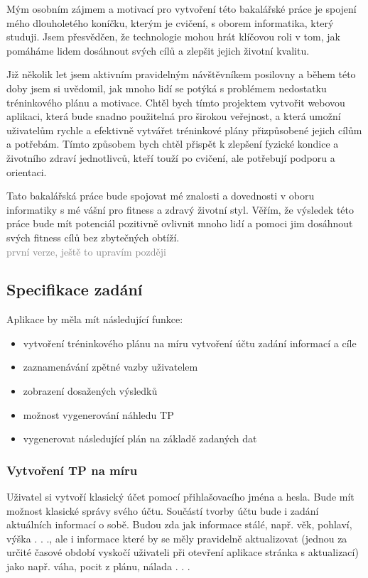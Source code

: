 \documentclass[
  field=inf,
  biblatex,
  glossaries,
  index
]{kidiplom}
\begin{document}
Mým osobním zájmem a motivací pro vytvoření této bakalářské práce je spojení mého dlouholetého koníčku, kterým je cvičení, s oborem informatika, který studuji. Jsem přesvědčen, že technologie mohou hrát klíčovou roli v tom, jak pomáháme lidem dosáhnout svých cílů a zlepšit jejich životní kvalitu.

Již několik let jsem aktivním pravidelným návštěvníkem posilovny a během této doby jsem si uvědomil, jak mnoho lidí se potýká s problémem nedostatku tréninkového plánu a motivace. Chtěl bych tímto projektem vytvořit webovou aplikaci, která bude snadno použitelná pro širokou veřejnost, a která umožní uživatelům rychle a efektivně vytvářet tréninkové plány přizpůsobené jejich cílům a potřebám. Tímto způsobem bych chtěl přispět k zlepšení fyzické kondice a životního zdraví jednotlivců, kteří touží po cvičení, ale potřebují podporu a orientaci.

Tato bakalářská práce bude spojovat mé znalosti a dovednosti v oboru informatiky s mé vášní pro fitness a zdravý životní styl. Věřím, že výsledek této práce bude mít potenciál pozitivně ovlivnit mnoho lidí a pomoci jim dosáhnout svých fitness cílů bez zbytečných obtíží.\\

\noindent\textcolor{gray}{první verze, ještě to upravím později}

\subsection{Specifikace zadání}
Aplikace by měla mít následující funkce:

\begin{itemize}

\item vytvoření tréninkového plánu na míru
\subitem vytvoření účtu
\subitem zadání informací a cíle

\item zaznamenávání zpětné vazby uživatelem

\item zobrazení dosažených výsledků

\item možnost vygenerování náhledu \gls{TP}

\item vygenerovat následující plán na základě zadaných dat

\end{itemize}

\subsubsection{Vytvoření \gls{TP} na míru}
Uživatel si vytvoří klasický účet pomocí přihlašovacího jména a hesla. Bude mít možnost klasické správy svého účtu. Součástí tvorby účtu bude i zadání aktuálních informací o sobě. Budou zda jak informace stálé, např. věk, pohlaví, výška . . ., ale i informace které by se měly pravidelně aktualizovat (jednou za určité časové období vyskočí uživateli při otevření aplikace stránka s aktualizací) jako např. váha, pocit z plánu, nálada . . . 
\end{document}
